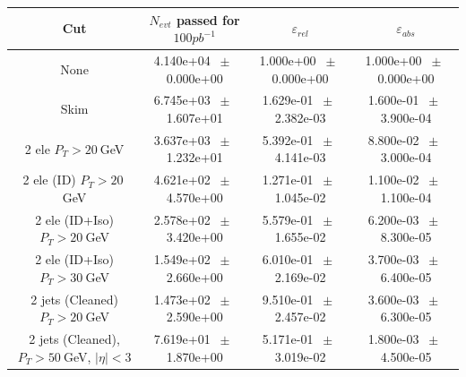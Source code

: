 \begin{table}[htbp] 
\begin{center} 
\begin{tabular}{|c|c|c|c|} 
\hline\hline 
 Cut & $N_{evt}$ passed for $100pb^{-1}$ & $\varepsilon_{rel}$ & $\varepsilon_{abs}$ \\ 
\hline\hline 
None          &           4.140e+04          $~\pm~$          0.000e+00           &           1.000e+00          $~\pm~$          0.000e+00           &           1.000e+00          $~\pm~$          0.000e+00          \\          
          Skim          &           6.745e+03          $~\pm~$          1.607e+01           &           1.629e-01          $~\pm~$          2.382e-03           &           1.600e-01          $~\pm~$          3.900e-04          \\          
          2 ele $P_T>20~$GeV          &           3.637e+03          $~\pm~$          1.232e+01           &           5.392e-01          $~\pm~$          4.141e-03           &           8.800e-02          $~\pm~$          3.000e-04          \\          
          2 ele (ID) $P_T>20~$GeV          &           4.621e+02          $~\pm~$          4.570e+00           &           1.271e-01          $~\pm~$          1.045e-02           &           1.100e-02          $~\pm~$          1.100e-04          \\          
          2 ele (ID+Iso) $P_T>20~$GeV          &           2.578e+02          $~\pm~$          3.420e+00           &           5.579e-01          $~\pm~$          1.655e-02           &           6.200e-03          $~\pm~$          8.300e-05          \\          
          2 ele (ID+Iso) $P_T>30~$GeV          &           1.549e+02          $~\pm~$          2.660e+00           &           6.010e-01          $~\pm~$          2.169e-02           &           3.700e-03          $~\pm~$          6.400e-05          \\          
          2 jets (Cleaned) $P_T>20~$GeV          &           1.473e+02          $~\pm~$          2.590e+00           &           9.510e-01          $~\pm~$          2.457e-02           &           3.600e-03          $~\pm~$          6.300e-05          \\          
          2 jets (Cleaned), $P_T>50~$GeV, $ | \eta |<3$          &           7.619e+01          $~\pm~$          1.870e+00           &           5.171e-01          $~\pm~$          3.019e-02           &           1.800e-03          $~\pm~$          4.500e-05          \\          

\end{tabular}
\end{center}
\end{table}
